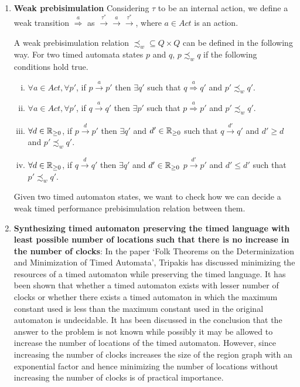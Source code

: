 \begin{enumerate}
\item \textbf{Weak prebisimulation} 
Considering $\tau$ to be an internal action, we define a weak transition $\stackrel{a}{\Rightarrow}$ as $\stackrel{\tau^*}{\rightarrow}\stackrel{a}{\rightarrow}\stackrel{\tau^*}{\rightarrow}$, where $a \in Act$ is an action.
\begin{definition}
A weak prebisimulation relation $\precsim_w \subseteq Q \times Q$ can be defined in the following way. For two timed automata states $p$ and $q$, $p \precsim_w q$ if the following conditions hold true.
\begin{enumerate}[(i)]
\item $\forall a \in Act, \forall p'$, if $p \stackrel{a}{\rightarrow} p'$ then $\exists q'$ such that $q \stackrel{a}{\Rightarrow} q'$ and $p' \precsim_w q'$.
\item $\forall a \in Act, \forall p'$, if $q \stackrel{a}{\rightarrow} q'$ then $\exists p'$ such that  $p \stackrel{a}{\Rightarrow} p'$ and $p' \precsim_w q'$.
\item $\forall d \in \mathbb{R}_{\ge 0}$, if $p \stackrel{d}{\rightarrow} p'$ then $\exists q'$ and $d' \in \mathbb{R}_{\ge 0}$ such that $q \stackrel{d'}{\rightarrow} q'$ and $d' \ge d$ and $p' \precsim_w q'$.
\item $\forall d \in \mathbb{R}_{\ge 0}$, if $q \stackrel{d}{\rightarrow} q'$ then $\exists q'$ and $d' \in \mathbb{R}_{\ge 0}$  $p \stackrel{d'}{\rightarrow} p'$ and $d' \le d' $ such that $p' \precsim_w q'$.
\end{enumerate}
\end{definition}
Given two timed automaton states, we want to check how we can decide a weak timed performance prebisimulation relation between them.

\item \textbf{Synthesizing timed automaton preserving the timed language with least possible number of locations such that there is no increase in the number of clocks}: In the paper `Folk Theorems on the Determinization and Minimization of Timed Automata', Tripakis has discussed minimizing the resources of a timed automaton while preserving the timed language. It has been shown that whether a timed automaton exists with lesser number of clocks or whether there exists a timed automaton in which the maximum constant used is less than the maximum constant used in the original automaton is undecidable. It has been discussed in the conclusion that the answer to the problem is not known while possibly it may be allowed to increase the number of locations of the timed automaton. However, since increasing the number of clocks increases the size of the region graph with an exponential factor and hence minimizing the number of locations without increasing the number of clocks is of practical importance.


\end{enumerate}
